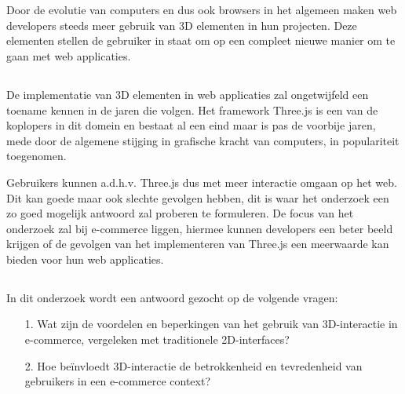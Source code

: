 
\chapter{}%
\label{ch:inleiding}

Door de evolutie van computers en dus ook browsers in het algemeen maken web developers steeds meer gebruik van 3D elementen in hun projecten. Deze elementen stellen de gebruiker in staat om op een compleet nieuwe manier om te gaan met web applicaties. 

\section{}%
\label{sec:probleemstelling}

De implementatie van 3D elementen in web applicaties zal ongetwijfeld een toename kennen in de jaren die volgen. Het framework Three.js is een van de koplopers in dit domein en bestaat al een eind maar is pas de voorbije jaren, mede door de algemene stijging in grafische kracht van computers, in populariteit toegenomen. 

Gebruikers kunnen a.d.h.v. Three.js dus met meer interactie omgaan op het web. Dit kan goede maar ook slechte gevolgen hebben, dit is waar het onderzoek een zo goed mogelijk antwoord zal proberen te formuleren. De focus van het onderzoek zal bij e-commerce liggen, hiermee kunnen developers een beter beeld krijgen of de gevolgen van het implementeren van Three.js een meerwaarde kan bieden voor hun web applicaties.

\section{}%
\label{sec:onderzoeksvraag}

In dit onderzoek wordt een antwoord gezocht op de volgende vragen:

\begin{itemize}
	\item[1.] Wat zijn de voordelen en beperkingen van het gebruik van 3D-interactie in e-commerce, vergeleken met traditionele 2D-interfaces?
	
	\item[2.] Hoe beïnvloedt 3D-interactie de betrokkenheid en tevredenheid van gebruikers in een e-commerce context?
	
\end{itemize}

